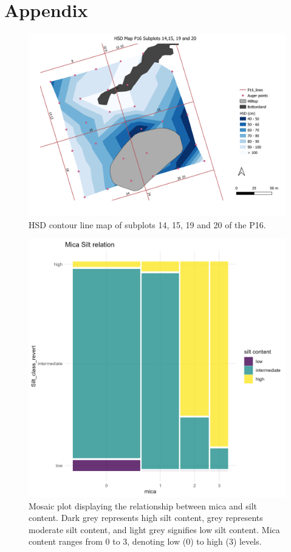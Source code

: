 \documentclass[fleqn,11pt]{latex/stylish_article} %
\begin{document}
\hypertarget{appendix}{%
\section{Appendix}\label{appendix}}



\scriptsize

\begin{figure}

{\centering \includegraphics[width=0.6\linewidth]{images/HSD_MapwithBFandPL} 

}

\caption{HSD contour line map of subplots 14, 15, 19 and 20 of the P16.}\label{fig:HSDMapwithBFandPL}
\end{figure}

\normalsize



\scriptsize

\begin{figure}

{\centering \includegraphics[width=0.6\linewidth]{images/augerPlot_micaCor} 

}

\caption{Mosaic plot displaying the relationship between mica and silt content. Dark grey represents high silt content, grey represents moderate silt content, and light grey signifies low silt content. Mica content ranges from 0 to 3, denoting low (0) to high (3) levels.}\label{fig:augerPlotmicaCor}
\end{figure}
\end{document}
